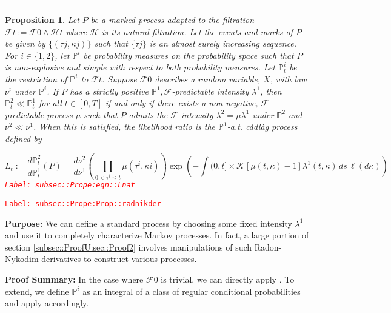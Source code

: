 \documentclass[12pt]{article}
\newcommand{\mb}{\mathbb}
\newcommand{\mc}{\mathcal}
\newcommand{\tr}{\textcolor{red}}
\newcommand{\labe}[1]{\tr{\texttt{Label: #1}}}
\newcommand{\purpose}{\textbf{Purpose: }}
\newcommand{\pfsum}{\textbf{Proof Summary: }}
\newcommand{\lin}{\rule{\linewidth}{0.4 pt}}
\newcommand{\pr}{\mb{P}}							%
\renewcommand{\t}{t}							%
\newcommand{\F}{\mc{F}}							%
\newcommand{\FH}{\mc{H}}						%
\newcommand{\rate}{\lambda}						%
\newcommand{\m}{\mu}							%
\newcommand{\mm}{\nu}							%
\newcommand{\rt}{\tau}							%
\renewcommand{\mark}{\kappa}					%
\newcommand{\rp}{P}								%
\newcommand{\mspce}{\mc{K}}						%
\newtheorem{prop}[thms]{Proposition}
\begin{document}
\lin

\begin{prop}
Let \(\rp\) be a marked process adapted to the filtration \(\F{\t} := \F{0}\wedge \FH{\t}\) where \(\FH\) is its natural filtration. Let the events and marks of \(\rp\) be given by \(\{(\rt{j},\mark{j})\}\) such that \(\{\rt{j}\}\) is an almost surely increasing sequence. For \(i \in \{1,2\}\), let \(\pr^i\) be probability measures on the probability space such that \(\rp\) is non-explosive and simple with respect to both probability measures. Let \(\pr^i_\t\) be the restriction of \(\pr^i\) to \(\F{\t}\). Suppose \(\F{0}\) describes a random variable, \(X\), with law \(\mm^i\) under \(\pr^i\). If \(\rp\) has a strictly positive \(\pr^1,\F\)-predictable intensity \(\rate^1\), then \(\pr^2_\t \ll \pr^1_\t\) for all \(\t \in [0,T]\) if and only if there exists a non-negative, \(\F\)-predictable process \(\m\) such that \(\rp\) admits the \(\F\)-intensity \(\rate^2 = \m\rate^1\) under \(\pr^2\) and \(\mm^2 \ll \mm^1\). When this is satisfied, the likelihood ratio is the \(\pr^1\)-a.t. c\`adl\`ag process defined by 

\begin{equation}
L_\t:= \frac{d\pr^2_\t}{d\pr^1_\t}(\rp) = \frac{d\mm^2}{d\mm^1}\left(\prod_{0<\rt^i\leq \t} \m(\rt^i,\mark{i})\right)\exp\left(-\int{(0,\t]\times \mspce}[\m(\t,\mark) - 1]\rate^1(\t,\mark)\,ds\,\ell(d\mark)\right)
\label{subsec::Prope:eqn::Lnat}
\end{equation}
\labe{subsec::Prope:eqn::Lnat}
\label{subsec::Prope:Prop::radnikder}
\end{prop}
\labe{subsec::Prope:Prop::radnikder}

\purpose We can define a standard process by choosing some fixed intensity \(\rate^1\) and use it to completely characterize Markov processes. In fact, a large portion of section \ref{subsec::ProofU:sec::Proof2} involves manipulations of such Radon-Nykodim derivatives to construct various processes.

\pfsum In the case where \(\F{0}\) is trivial, we can directly apply \cite[Theorem 14.4.I]{DalVer08}. To extend, we define \(\pr^i\) as an integral of a class of regular conditional probabilities and apply \cite[Theorem 14.4.I]{DalVer08} accordingly.
\end{document}

